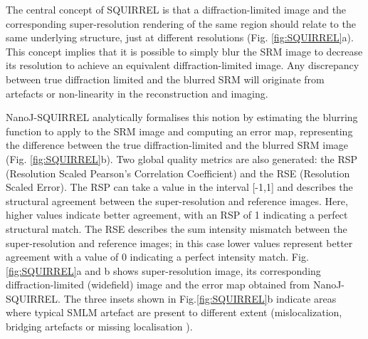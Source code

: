  The central concept of SQUIRREL is that a diffraction-limited image and the corresponding super-resolution rendering of the same region should relate to the same underlying structure, just at different resolutions (Fig. \ref{fig:SQUIRREL}a). This concept implies that it is possible to simply blur the SRM image to decrease its resolution to achieve an equivalent diffraction-limited image. Any discrepancy between true diffraction limited and the blurred SRM will originate from artefacts or non-linearity in the reconstruction and imaging.

 NanoJ-SQUIRREL analytically formalises this notion by estimating the blurring function to apply to the SRM image and computing an error map, representing the difference between the true diffraction-limited and the blurred SRM image (Fig. \ref{fig:SQUIRREL}b). Two global quality metrics are also generated: the RSP (Resolution Scaled Pearson’s Correlation Coefficient) and the RSE (Resolution Scaled Error). The RSP can take a value in the interval [-1,1] and describes the structural agreement between the super-resolution and reference images. Here, higher values indicate better agreement, with an RSP of 1 indicating a perfect structural match. The RSE describes the sum intensity mismatch between the super-resolution and reference images; in this case lower values represent better agreement with a value of 0 indicating a perfect intensity match. Fig.\ref{fig:SQUIRREL}a and b shows super-resolution image, its corresponding diffraction-limited (widefield) image and the error map obtained from NanoJ-SQUIRREL. The three insets shown in Fig.\ref{fig:SQUIRREL}b indicate areas where typical SMLM artefact are present to different extent (mislocalization, bridging artefacts or missing localisation \cite{waldchen2015light}). 


